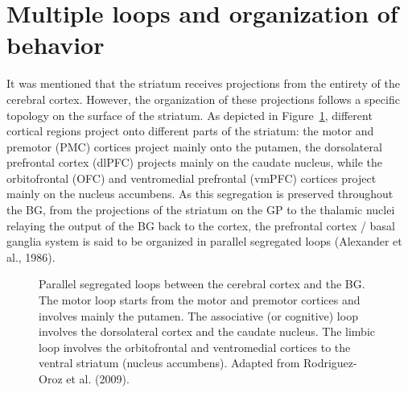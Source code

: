 \documentclass[
  11pt,
  a4paper,
]{scrbook}
\begin{document}
\section{Multiple loops and organization of
behavior}\label{multiple-loops-and-organization-of-behavior}

It was mentioned that the striatum receives projections from the
entirety of the cerebral cortex. However, the organization of these
projections follows a specific topology on the surface of the striatum.
As depicted in Figure~\ref{fig-intro:Rodriguez-Oroz2009}, different
cortical regions project onto different parts of the striatum: the motor
and premotor (PMC) cortices project mainly onto the putamen, the
dorsolateral prefrontal cortex (dlPFC) projects mainly on the caudate
nucleus, while the orbitofrontal (OFC) and ventromedial prefrontal
(vmPFC) cortices project mainly on the nucleus accumbens. As this
segregation is preserved throughout the BG, from the projections of the
striatum on the GP to the thalamic nuclei relaying the output of the BG
back to the cortex, the prefrontal cortex / basal ganglia system is said
to be organized in parallel segregated loops (Alexander et al., 1986).

\begin{figure}


\caption{\label{fig-intro:Rodriguez-Oroz2009}Parallel segregated loops
between the cerebral cortex and the BG. The motor loop starts from the
motor and premotor cortices and involves mainly the putamen. The
associative (or cognitive) loop involves the dorsolateral cortex and the
caudate nucleus. The limbic loop involves the orbitofrontal and
ventromedial cortices to the ventral striatum (nucleus accumbens).
Adapted from Rodriguez-Oroz et al. (2009).}

\end{figure}%
\end{document}

